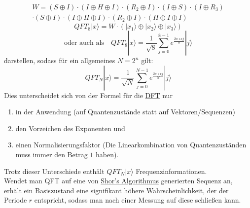 \begin{multline}
	W = (S\oplus I)\cdot (I \oplus H \oplus I) \cdot (R_2 \oplus I) \cdot (I \oplus S) \cdot (I\oplus R_3)\\ \cdot (S \oplus I) \cdot (I \oplus H \oplus I) \cdot (R_2 \oplus I) \cdot (H \oplus I \oplus I)
\end{multline}
\[QFT_8 |x\rangle = W \cdot \left(|x_1\rangle \oplus |x_2\rangle \oplus |x_3\rangle\right)\]
\[\text{oder auch als}\quad QFT_8 |x\rangle = \frac{1}{\sqrt{8}}\sum_{j=0}^{8-1} e^{\frac{2\pi \imath x j}{8}}|j\rangle\]
darstellen, sodass für ein allgemeines \(N = 2^n\) gilt:
\[QFT_N |x\rangle = \frac{1}{\sqrt{N}}\sum_{j=0}^{N-1} e^{\frac{2\pi \imath x j}{N}}|j\rangle\]
\cite{noauthor_quanten-fouriertransformation_2024}
Dies unterscheidet sich von der Formel für die \hyperref[sec:DFT]{DFT} nur
\begin{enumerate}
	\item in der Anwendung (auf Quantenzustände statt auf Vektoren/Sequenzen)
	\item den Vorzeichen des Exponenten und
	\item einen Normalisierungsfaktor (Die Linearkombination von Quantenzuständen muss immer den Betrag \(1\) haben).
\end{enumerate}
Trotz dieser Unterschiede enthält \(QFT_N |x\rangle\) Frequenzinformationen.\\
Wendet man QFT auf eine von \hyperref[sec:shor]{Shor's Algorithmus} generierten Sequenz an, erhält ein Basiszustand eine signifikant höhere Wahrscheinlichkeit, der der Periode \(r\) entspricht, sodass man nach einer Messung auf diese schließen kann.